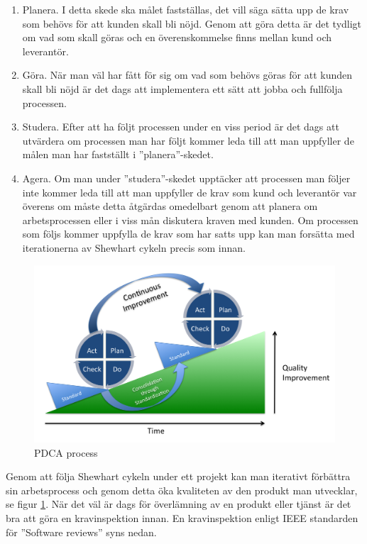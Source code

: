 \begin{enumerate}
  \item Planera. I detta skede ska målet fastställas, det vill säga sätta upp de krav som behövs för att kunden skall bli nöjd. Genom att göra detta är det tydligt om vad som skall göras och en överenskommelse finns mellan kund och leverantör. 
  \item Göra. När man väl har fått för sig om vad som behövs göras för att kunden skall bli nöjd är det dags att implementera ett sätt att jobba och fullfölja processen.
  \item Studera. Efter att ha följt processen under en viss period är det dags att utvärdera om processen man har följt kommer leda till att man uppfyller de målen man har fastställt i ''planera''-skedet.
  \item Agera. Om man under ''studera''-skedet upptäcker att processen man följer inte kommer leda till att man uppfyller de krav som kund och leverantör var överens om måste detta åtgärdas omedelbart genom att planera om arbetsprocessen eller i viss mån diskutera kraven med kunden. Om processen som följs kommer uppfylla de krav som har satts upp kan man forsätta med iterationerna av Shewhart cykeln precis som innan.
\end{enumerate}

\begin{figure}[h]
\centerline{\includegraphics[scale=0.15]{ruben-tex/graphic/PDCA_Process}}
\caption{PDCA process}
\label{fig:pdcaprocess}
\end{figure}

\noindent Genom att följa Shewhart cykeln under ett projekt kan man iterativt förbättra sin arbetsprocess och genom detta öka kvaliteten av den produkt man utvecklar, se figur \ref{fig:pdcaprocess}.
\newline
\newline
När det väl är dags för överlämning av en produkt eller tjänst är det bra att göra en kravinspektion innan. En kravinspektion enligt IEEE standarden för ''Software reviews'' syns nedan.

